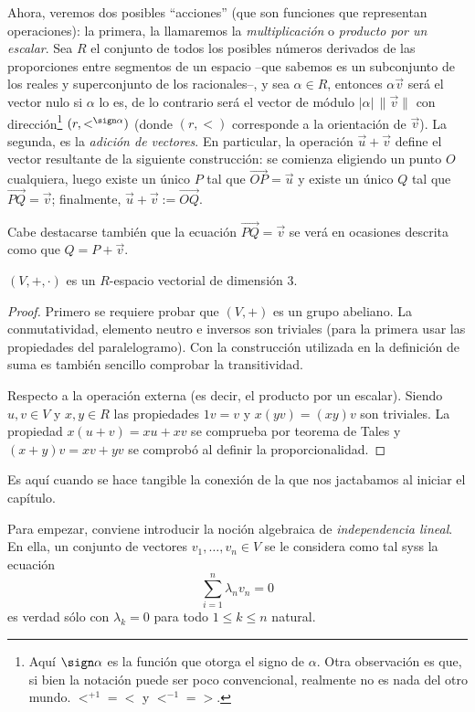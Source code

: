 \documentclass[11pt,a4paper]{book}
\begin{document}
Ahora, veremos dos posibles ``acciones'' (que son funciones que representan operaciones): la primera, la llamaremos la \textit{multiplicación} o \textit{producto por un escalar}. Sea $R$ el conjunto de todos los posibles números derivados de las proporciones entre segmentos de un espacio --que sabemos es un subconjunto de los reales y superconjunto de los racionales--, y sea $\alpha\in R$, entonces $\alpha\vec{v}$ será el vector nulo si $\alpha$ lo es, de lo contrario será el vector de módulo $|\alpha|\,\|\vec{v}\|$ con dirección\footnote{Aquí $\sign\alpha$ es la función que otorga el signo de $\alpha$. Otra observación es que, si bien la notación puede ser poco convencional, realmente no es nada del otro mundo. ${<^{+1}}={<}$ y ${<^{-1}}={>}$.} $(r,<^{\sign\alpha})$ (donde $(r,<)$ corresponde a la orientación de $\vec{v}$). La segunda, es la \textit{adición de vectores}. En particular, la operación $\vec{u}+\vec{v}$ define el vector resultante de la siguiente construcción: se comienza eligiendo un punto $O$ cualquiera, luego existe un único $P$ tal que $\overrightarrow{OP}=\vec{u}$ y existe un único $Q$ tal que $\overrightarrow{PQ}=\vec{v}$; finalmente, $\vec{u}+\vec{v}:=\overrightarrow{OQ}$.

Cabe destacarse también que la ecuación $\overrightarrow{PQ}=\vec v$ se verá en ocasiones descrita como que $Q=P+\vec v$.
\begin{thm}
	$(V,+,\cdot)$ es un $R$-espacio vectorial de dimensión 3.
\end{thm}
\begin{proof}
	Primero se requiere probar que $(V,+)$ es un grupo abeliano. La conmutatividad, elemento neutro e inversos son triviales (para la primera usar las propiedades del paralelogramo). Con la construcción utilizada en la definición de suma es también sencillo comprobar la transitividad.

	Respecto a la operación externa (es decir, el producto por un escalar). Siendo $u,v\in V$ y $x,y\in R$ las propiedades $1v=v$ y $x(yv)=(xy)v$ son triviales. La propiedad $x(u+v)=xu+xv$ se comprueba por teorema de Tales y $(x+y)v=xv+yv$ se comprobó al definir la proporcionalidad.
\end{proof}
Es aquí cuando se hace tangible la conexión de la que nos jactabamos al iniciar el capítulo. 

Para empezar, conviene introducir la noción algebraica de \textit{independencia lineal}. En ella, un conjunto de vectores $v_1,\dots,v_n\in V$ se le considera como tal syss la ecuación
$$\sum_{i=1}^n\lambda_n v_n=0$$
es verdad sólo con $\lambda_k=0$ para todo $1\leq k\leq n$ natural.
\end{document}
